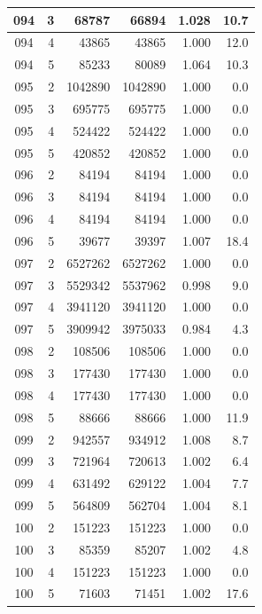 \begin{longtable}{|c|r|r|r|r|r|}
\hline
094 & 3 & 68787 & 66894 & 1.028 & 10.7 \\
\hline
094 & 4 & 43865 & 43865 & 1.000 & 12.0 \\
\hline
094 & 5 & 85233 & 80089 & 1.064 & 10.3 \\
\hline
095 & 2 & 1042890 & 1042890 & 1.000 & 0.0 \\
\hline
095 & 3 & 695775 & 695775 & 1.000 & 0.0 \\
\hline
095 & 4 & 524422 & 524422 & 1.000 & 0.0 \\
\hline
095 & 5 & 420852 & 420852 & 1.000 & 0.0 \\
\hline
096 & 2 & 84194 & 84194 & 1.000 & 0.0 \\
\hline
096 & 3 & 84194 & 84194 & 1.000 & 0.0 \\
\hline
096 & 4 & 84194 & 84194 & 1.000 & 0.0 \\
\hline
096 & 5 & 39677 & 39397 & 1.007 & 18.4 \\
\hline
097 & 2 & 6527262 & 6527262 & 1.000 & 0.0 \\
\hline
097 & 3 & 5529342 & 5537962 & 0.998 & 9.0 \\
\hline
097 & 4 & 3941120 & 3941120 & 1.000 & 0.0 \\
\hline
097 & 5 & 3909942 & 3975033 & 0.984 & 4.3 \\
\hline
098 & 2 & 108506 & 108506 & 1.000 & 0.0 \\
\hline
098 & 3 & 177430 & 177430 & 1.000 & 0.0 \\
\hline
098 & 4 & 177430 & 177430 & 1.000 & 0.0 \\
\hline
098 & 5 & 88666 & 88666 & 1.000 & 11.9 \\
\hline
099 & 2 & 942557 & 934912 & 1.008 & 8.7 \\
\hline
099 & 3 & 721964 & 720613 & 1.002 & 6.4 \\
\hline
099 & 4 & 631492 & 629122 & 1.004 & 7.7 \\
\hline
099 & 5 & 564809 & 562704 & 1.004 & 8.1 \\
\hline
100 & 2 & 151223 & 151223 & 1.000 & 0.0 \\
\hline
100 & 3 & 85359 & 85207 & 1.002 & 4.8 \\
\hline
100 & 4 & 151223 & 151223 & 1.000 & 0.0 \\
\hline
100 & 5 & 71603 & 71451 & 1.002 & 17.6 \\
\hline
\end{longtable}
\normalsize
\renewcommand{\arraystretch}{1.2}

